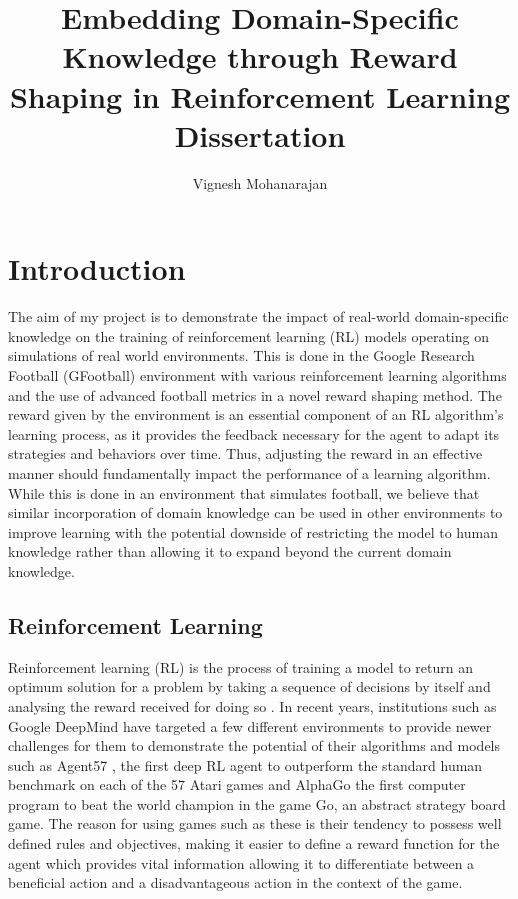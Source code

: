 \documentclass[11pt]{article}
\title{Embedding Domain-Specific Knowledge through Reward Shaping in Reinforcement Learning \\[1ex] \large Dissertation}
\author{Vignesh Mohanarajan}
\begin{document}
\begin{titlepage}
\maketitle
\end{titlepage}
\tableofcontents
\pagebreak

\section{Introduction}

The aim of my project is to demonstrate the impact of real-world domain-specific knowledge on the training of reinforcement learning (RL) models operating on simulations of real world environments. This is done in the Google Research Football (GFootball) environment \cite{Kurach2020} with various reinforcement learning algorithms and the use of advanced football metrics in a novel reward shaping method. The reward given by the environment is an essential component of an RL algorithm's learning process, as it provides the feedback necessary for the agent to adapt its strategies and behaviors over time. Thus, adjusting the reward in an effective manner should fundamentally impact the performance of a learning algorithm. While this is done in an environment that simulates football, we believe that similar incorporation of domain knowledge can be used in other environments to improve learning with the potential downside of restricting the model to human knowledge rather than allowing it to expand beyond the current domain knowledge.


\subsection{Reinforcement Learning}
Reinforcement learning (RL) is the process of training a model to return an optimum solution for a problem by taking a sequence of decisions by itself and analysing the reward received for doing so \cite{Wu2022}. In recent years, institutions such as Google DeepMind have targeted a few different environments to provide newer challenges for them to demonstrate the potential of their algorithms and models such as Agent57 \cite{Badia2020}, the first deep RL agent to outperform the standard human benchmark on each of the 57 Atari games and AlphaGo \cite{Silver2016} the first computer program to beat the world champion in the game Go, an abstract strategy board game. The reason for using games such as these is their tendency to possess well defined rules and objectives, making it easier to define a reward function for the agent which provides vital information allowing it to differentiate between a beneficial action and a disadvantageous action in the context of the game.
\end{document}
